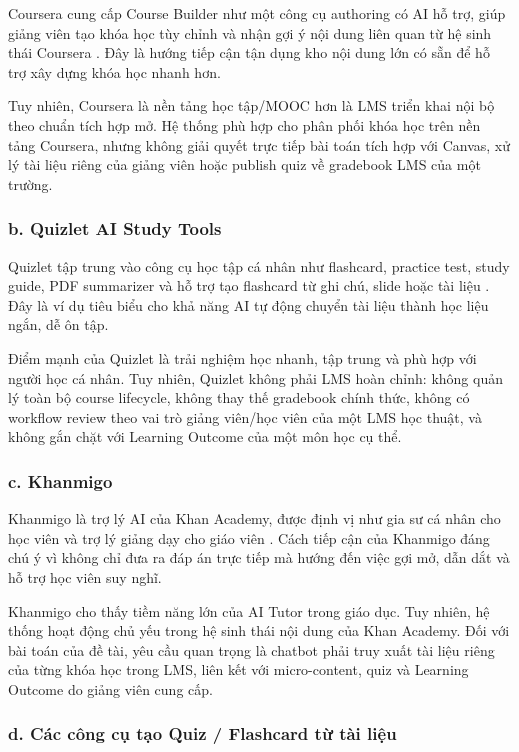 Coursera cung cấp Course Builder như một công cụ authoring có AI hỗ trợ, giúp
giảng viên tạo khóa học tùy chỉnh và nhận gợi ý nội dung liên quan từ hệ sinh
thái Coursera \cite{coursera-builder}. Đây là hướng tiếp cận
tận dụng kho nội dung lớn có sẵn để hỗ trợ xây dựng khóa học nhanh hơn.

Tuy nhiên, Coursera là nền tảng học tập/MOOC hơn là LMS triển khai nội bộ theo
chuẩn tích hợp mở. Hệ thống phù hợp cho phân phối khóa học trên nền tảng
Coursera, nhưng không giải quyết trực tiếp bài toán tích hợp với Canvas, xử lý
tài liệu riêng của giảng viên hoặc publish quiz về gradebook LMS của một
trường.

\subsubsection*{b. Quizlet AI Study Tools}

Quizlet tập trung vào công cụ học tập cá nhân như flashcard, practice test,
study guide, PDF summarizer và hỗ trợ tạo flashcard từ ghi chú, slide hoặc tài
liệu \cite{quizlet-ai}. Đây là ví dụ tiêu biểu
cho khả năng AI tự động chuyển tài liệu thành học liệu ngắn, dễ ôn tập.

Điểm mạnh của Quizlet là trải nghiệm học nhanh, tập trung và phù hợp với người
học cá nhân. Tuy nhiên, Quizlet không phải LMS hoàn chỉnh: không quản lý toàn
bộ course lifecycle, không thay thế gradebook chính thức, không có workflow
review theo vai trò giảng viên/học viên của một LMS học thuật, và không gắn
chặt với Learning Outcome của một môn học cụ thể.

\subsubsection*{c. Khanmigo}

Khanmigo là trợ lý AI của Khan Academy, được định vị như gia sư cá nhân cho học
viên và trợ lý giảng dạy cho giáo viên \cite{khanmigo}. Cách tiếp cận của
Khanmigo đáng chú ý vì không chỉ đưa ra đáp án trực tiếp mà hướng đến việc gợi
mở, dẫn dắt và hỗ trợ học viên suy nghĩ.

Khanmigo cho thấy tiềm năng lớn của AI Tutor trong giáo dục. Tuy nhiên, hệ
thống hoạt động chủ yếu trong hệ sinh thái nội dung của Khan Academy. Đối với
bài toán của đề tài, yêu cầu quan trọng là chatbot phải truy xuất tài liệu
riêng của từng khóa học trong LMS, liên kết với micro-content, quiz và Learning
Outcome do giảng viên cung cấp.

\subsubsection*{d. Các công cụ tạo Quiz / Flashcard từ tài liệu}

